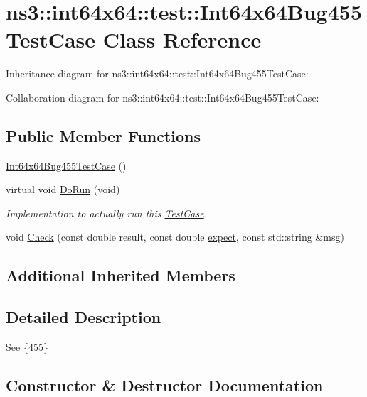 \hypertarget{classns3_1_1int64x64_1_1test_1_1Int64x64Bug455TestCase}{}\section{ns3\+:\+:int64x64\+:\+:test\+:\+:Int64x64\+Bug455\+Test\+Case Class Reference}
\label{classns3_1_1int64x64_1_1test_1_1Int64x64Bug455TestCase}


Inheritance diagram for ns3\+:\+:int64x64\+:\+:test\+:\+:Int64x64\+Bug455\+Test\+Case\+:


Collaboration diagram for ns3\+:\+:int64x64\+:\+:test\+:\+:Int64x64\+Bug455\+Test\+Case\+:
\subsection*{Public Member Functions}
\begin{DoxyCompactItemize}
\item 
\hyperlink{classns3_1_1int64x64_1_1test_1_1Int64x64Bug455TestCase_a34f650dccf5d4c8250da9c496452f127}{Int64x64\+Bug455\+Test\+Case} ()
\item 
virtual void \hyperlink{classns3_1_1int64x64_1_1test_1_1Int64x64Bug455TestCase_ad58c334e30b45c767a0f3fa44433335c}{Do\+Run} (void)
\begin{DoxyCompactList}\small\item\em Implementation to actually run this \hyperlink{classns3_1_1TestCase}{Test\+Case}. \end{DoxyCompactList}\item 
void \hyperlink{classns3_1_1int64x64_1_1test_1_1Int64x64Bug455TestCase_a2f804771e031d459c8bd61645b347b13}{Check} (const double result, const double \hyperlink{doc_2readme_8txt_a11460adc33d00ccf94a559cdd45990ea}{expect}, const std\+::string \&msg)
\end{DoxyCompactItemize}
\subsection*{Additional Inherited Members}


\subsection{Detailed Description}
See \{455\} 

\subsection{Constructor \& Destructor Documentation}
